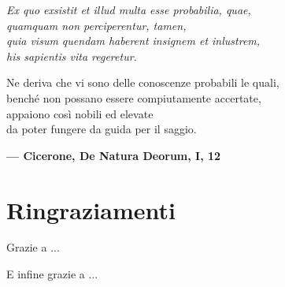 
\begin{flushright}
{
	\emph{
		Ex quo exsistit et illud multa esse probabilia, quae, \\
		quamquam non perciperentur, tamen, \\
		quia visum quendam haberent insignem et inlustrem, \\
		his sapientis vita regeretur. \\
	}

	\medskip

	Ne deriva che vi sono delle conoscenze probabili le quali, \\
	benché non possano essere compiutamente accertate, \\
	appaiono così nobili ed elevate \\
	da poter fungere da guida per il saggio. \\

	\medskip

	\textbf{--- Cicerone, De Natura Deorum, I, 12} 
}
\end{flushright}

\bigskip

\begingroup
\let\clearpage\relax
\let\cleardoublepage\relax
\let\cleardoublepage\relax
\chapter*{Ringraziamenti}

Grazie a ...

\bigskip

E infine grazie a ...

\endgroup
